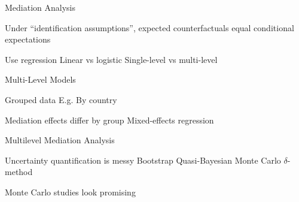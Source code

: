\documentclass[14pt]{beamer}
\begin{document}
\begin{frame}{Mediation Analysis}
    \begin{outline}
        \1 Under ``identification assumptions'', expected counterfactuals equal conditional expectations \newline

        \1 Use regression
            \2 Linear vs logistic
            \2 Single-level vs multi-level
    \end{outline}
\end{frame}

\begin{frame}{Multi-Level Models}
    \begin{outline}
        \1 Grouped data
            \2 E.g. By country \newline

        \1 Mediation effects differ by group
            \2 Mixed-effects regression
    \end{outline}
\end{frame}

\begin{frame}{Multilevel Mediation Analysis}
    \begin{outline}
        \1 Uncertainty quantification is messy
            \2 Bootstrap
            \2 Quasi-Bayesian Monte Carlo
            \2 $\delta$-method \newline

        \1 Monte Carlo studies look promising
    \end{outline}
\end{frame}


    
\end{document}
